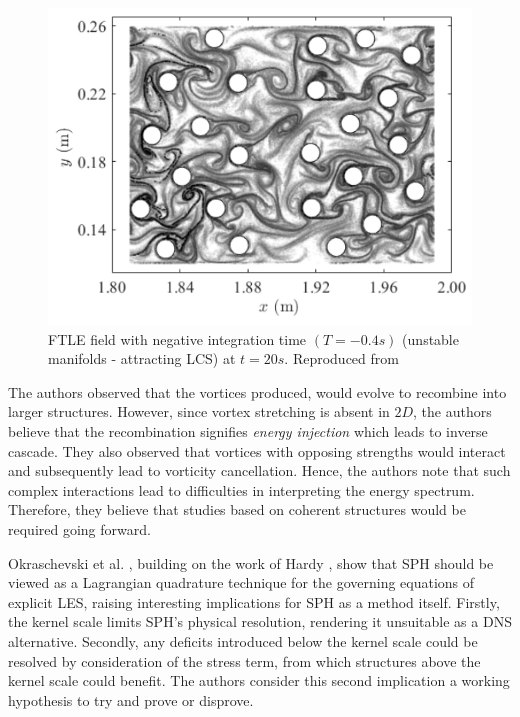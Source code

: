 \begin{figure}[H]
    \centering
    \includegraphics{Figures/research_papers/Canelas2016-ftle-field.png}
    \caption{FTLE field with negative integration time $(T = -0.4 s)$ (unstable manifolds - attracting LCS) at $t = 20s$. Reproduced from \cite{Canelas2016}}
    \label{fig:Canelas2016-ftle-field}
\end{figure}

The authors observed that the vortices produced, would evolve to recombine into larger structures. However, since vortex stretching is absent in $2D$, the authors believe that the recombination signifies \textit{energy injection} which leads to inverse cascade. They also observed that vortices with opposing strengths would interact and subsequently lead to vorticity cancellation. Hence, the authors note that such complex interactions lead to difficulties in interpreting the energy spectrum. Therefore, they believe that studies based on coherent structures would be required going forward.

Okraschevski et al. \parencite{Okraschevski2022}, building on the work of Hardy \parencite{hardy1982formulas}, show that SPH should be viewed as a Lagrangian quadrature technique for the governing equations of explicit LES, raising interesting implications for SPH as a method itself. Firstly, the kernel scale limits SPH’s physical resolution, rendering it unsuitable as a DNS alternative. Secondly, any deficits introduced below the kernel scale could be resolved by consideration of the stress term, from which structures above the kernel scale could benefit. The authors consider this second implication a working hypothesis to try and prove or disprove.

